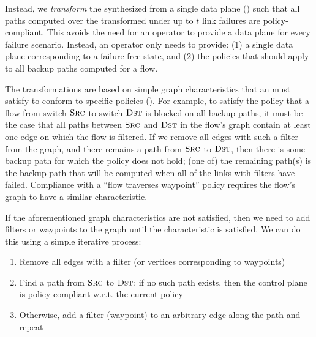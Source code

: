 Instead, we 
{\em transform} the \ARC synthesized from a single data plane
() such that all paths computed over the transformed \ARC under
up to $t$ link failures are policy-compliant. This avoids the need for an
operator to provide a data plane for every failure scenario. Instead, an
operator only needs to provide: (1) a single data plane corresponding to a
failure-free state, and (2) the policies that should apply to all backup paths
computed for a flow. 



The transformations are based on simple graph characteristics that an \ARC
must satisfy to conform to specific policies
().   
For example, to satisfy the policy that a flow from switch $\textsc{Src}$ to
switch $\textsc{Dst}$ is blocked on all backup paths, it must be the case that
all paths between $\textsc{Src}$ and $\textsc{Dst}$ in the flow's graph  
contain at least one edge on which the flow is
filtered. If we remove all edges with such a filter from the graph, and there
remains a path from $\textsc{Src}$ to $\textsc{Dst}$, then there is some backup
path for which the policy does not hold; (one of) the remaining path(s) is the
backup path that will be computed when all of the links with filters have
failed. Compliance with a ``flow traverses waypoint'' policy requires the
flow's graph to have a similar characteristic.

If the aforementioned graph characteristics are not satisfied, then we need to
add filters or waypoints to the graph until the characteristic is satisfied.
We can do this using a simple iterative process: 
\begin{enumerate}
\item Remove all edges with a filter (or vertices corresponding to waypoints) 
\item Find a path from $\textsc{Src}$ to $\textsc{Dst}$; if no such path exists,
    then the control plane is policy-compliant w.r.t. the current policy
\item Otherwise, add a filter (waypoint) to an arbitrary edge along the path
    and repeat
\end{enumerate}

